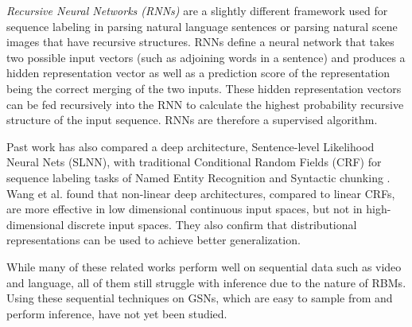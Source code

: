 \emph{Recursive Neural Networks (RNNs)} \cite{socher11} are a slightly different framework used for sequence labeling in parsing natural language sentences or parsing natural scene images that have recursive structures. RNNs define a neural network that takes two possible input vectors (such as adjoining words in a sentence) and produces a hidden representation vector as well as a prediction score of the representation being the correct merging of the two inputs. These hidden representation vectors can be fed recursively into the RNN to calculate the highest probability recursive structure of the input sequence. RNNs are therefore a supervised algorithm.

Past work has also compared a deep architecture, Sentence-level Likelihood Neural Nets (SLNN), with traditional Conditional Random Fields (CRF) for sequence labeling tasks of Named Entity Recognition and Syntactic chunking \cite{wang13}. Wang et al. found that non-linear deep architectures, compared to linear CRFs, are more effective in low dimensional continuous input spaces, but not in high-dimensional discrete input spaces. They also confirm that distributional representations can be used to achieve better generalization.

While many of these related works perform well on sequential data such as video and language, all of them still struggle with inference due to the nature of RBMs. Using these sequential techniques on GSNs, which are easy to sample from and perform inference, have not yet been studied.